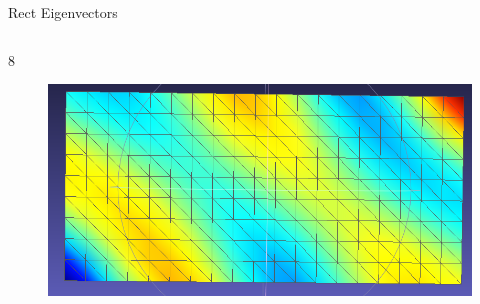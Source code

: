 \documentclass{beamer}
\begin{document}
\begin{frame}{Rect Eigenvectors}
\begin{columns}
\begin{column}[T]{5cm}
\begin{figure}[t]
\end{figure}
8
\begin{figure}[t]
    \includegraphics[width=\textwidth]{Harmonics/RectModes/rect8.png}
\end{figure}
\end{column}
\end{columns}

\end{frame}
\end{document}
